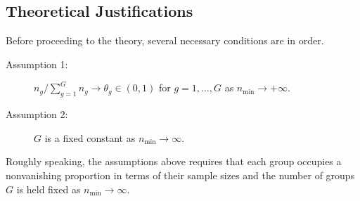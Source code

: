 \documentclass[alpha-refs]{wiley-article}
\theoremstyle{plain}%
\theoremstyle{definition}
\newcommand{\rsz}[1]{\textcolor{red}{#1}}
\begin{document}
\subsection{Theoretical Justifications} 
Before proceeding to the theory, several necessary conditions are in order.
\begin{description}
  \item[Assumption 1:] $n_g /\sum_{g=1}^{G}n_g \rightarrow \theta_g \in (0, 1)$ for $g=1,\ldots, G$ as $n_{\min} \rightarrow +\infty$. 
  \item[Assumption 2:] $G$ is a fixed constant as $n_{\min} \rightarrow \infty$.
 \end{description}
  Roughly speaking, the assumptions above requires that each group occupies a nonvanishing proportion in terms of their sample sizes and the number of groups $G$ is held fixed as $n_{\min}\to\infty$.
\end{document}
